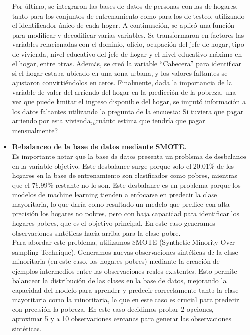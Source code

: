 \documentclass[a4paper]{article}
\theoremstyle{remark}
\theoremstyle{definition}
\begin{document}
\begin{itemize}
Por último, se integraron las bases de datos de personas con las de hogares, tanto para los conjuntos de entrenamiento como para los de testeo, utilizando el identificador único de cada hogar. A continuación, se aplicó una función para modificar y decodificar varias variables. Se transformaron en factores las variables relacionadas con el dominio, oficio, ocupación del jefe de hogar, tipo de vivienda, nivel educativo del jefe de hogar y el nivel educativo máximo en el hogar, entre otras. Además, se creó la variable “Cabecera” para identificar si el hogar estaba ubicado en una zona urbana, y los valores faltantes se ajustaron convirtiéndolos en ceros. Finalmente, dada la importancia de la variable de valor del arriendo del hogar en la predicción de la pobreza, una vez que puede limitar el ingreso disponible del hogar, se imputó información a los datos faltantes utilizando la pregunta de la encuesta: Si tuviera que pagar arriendo por esta vivienda,¿cuánto estima que tendría que pagar mensualmente? \\

    \item \textbf{Rebalanceo de la base de datos mediante SMOTE.} \\

Es importante notar que la base de datos presenta un problema de desbalance en la variable objetivo. Este desbalance surge porque solo el 20.01\% de los hogares en la base de entrenamiento son clasificados como pobres, mientras que el 79.99\% restante no lo son. Este desbalance es un problema porque los modelos de machine learning tienden a enfocarse en predecir la clase mayoritaria, lo que daría como resultado un modelo que predice con alta precisión los hogares no pobres, pero con baja capacidad para identificar los hogares pobres, que es el objetivo principal. En este caso generamos observaciones sintéticas hacia arriba para la clase pobre.\\

Para abordar este problema, utilizamos SMOTE (Synthetic Minority Over-sampling Technique). Generamos nuevas observaciones sintéticas de la clase minoritaria (en este caso, los hogares pobres) mediante la creación de ejemplos intermedios entre las observaciones reales existentes. Esto permite balancear la distribución de las clases en la base de datos, mejorando la capacidad del modelo para aprender y predecir correctamente tanto la clase mayoritaria como la minoritaria, lo que en este caso es crucial para predecir con precisión la pobreza. En este caso decidimos probar 2 opciones, aproximar 5 y a 10 observaciones cercanas para generar las observaciones sintéticas.
    
\end{itemize}
\end{document}
